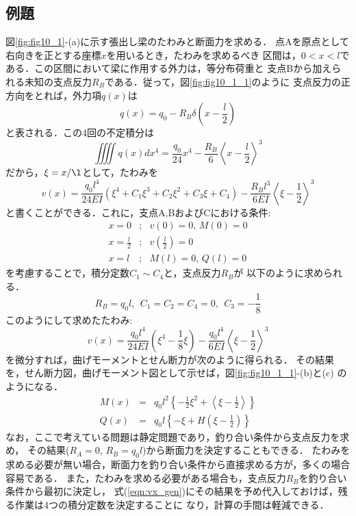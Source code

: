 \documentclass[10pt,a4j]{jbook}
\begin{document}
\subsection{例題}
図\ref{fig:fig10_1}-(a)に示す張出し梁のたわみと断面力を求める．
点Aを原点として右向きを正とする座標$x$を用いるとき，たわみを求めるべき
区間は，$0<x<l$である．この区間において梁に作用する外力は，等分布荷重と
支点Bから加えられる未知の支点反力$R_B$である．従って，図\ref{fig:fig10_1_1}のように
支点反力の正方向をとれば，外力項$q(x)$は
\begin{equation}
	q(x)=q_0-R_B\delta\left(x-\frac{l}{2}\right)
	\label{eqn:qx}
\end{equation}
と表される．この4回の不定積分は
\begin{equation}
	\iiiint q(x) dx^4= \frac{q_0}{24}x^4-\frac{R_B}{6}\left<x-\frac{l}{2}\right>^3
	\label{eqn:int_qx4}
\end{equation}
だから，$\xi=x/\l$として，たわみを
\begin{equation}
	v(x)=\frac{q_0l^4}{24EI}\left( \xi^4+C_1\xi^3 +C_2\xi^2+C_3\xi+C_4\right)
	-
	\frac{R_Bl^3}{6EI}\left< \xi-\frac{1}{2}\right>^3
	\label{eqn:vx_gen}
\end{equation}
と書くことができる．これに，支点A,BおよびCにおける条件:
\begin{eqnarray}
	x=0 &;& v(0)=0, \, M(0)=0 
	\\
	x=\frac{l}{2} &;& v\left( \frac{l}{2} \right)=0
	\\
	x=l &;& M(l)=0,\, Q(l)=0
\end{eqnarray}
を考慮することで，積分定数$C_1\sim C_4$と，支点反力$R_B$が
以下のように求められる．
\begin{equation}
	R_B=q_0l, \ \ C_1=C_2=C_4=0, \ \ C_3=-\frac{1}{8}
\end{equation}
このようにして求めたたわみ:
\begin{equation}
	v(x)=\frac{q_0l^4}{24EI}\left( \xi^4-\frac{1}{8}\xi\right)
	-
	\frac{q_0l^4}{6EI}\left< \xi-\frac{1}{2}\right>^3
	\label{eqn:vx}
\end{equation}
を微分すれば，曲げモーメントとせん断力が次のように得られる．
その結果を，せん断力図，曲げモーメント図として示せば，図\ref{fig:fig10_1_1}-(b)と(c)
のようになる．
\begin{eqnarray}
	M(x)&=&
	q_0l^2 \left\{ -\frac{1}{2}\xi^2 + \left< \xi -\frac{1}{2}\right> \right\}
	\\
	Q(x)&=&
	q_0l \left\{-\xi+H\left(\xi-\frac{1}{2}\right)\right\}
\end{eqnarray}
なお，ここで考えている問題は静定問題であり，釣り合い条件から支点反力を求め，
その結果($R_A=0,\, R_B=q_0l$)から断面力を決定することもできる．
たわみを求める必要が無い場合，断面力を釣り合い条件から直接求める方が，多くの場合容易である．
また，たわみを求める必要がある場合も，支点反力$R_B$を釣り合い条件から最初に決定し，
式(\ref{eqn:vx_gen})にその結果を予め代入しておけば，残る作業は4つの積分定数を決定することに
なり，計算の手間は軽減できる．
\end{document}
